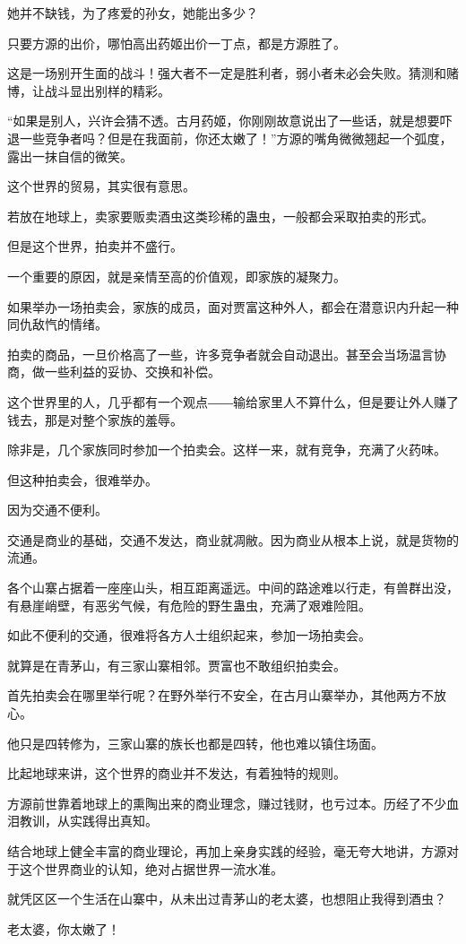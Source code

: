 \begin{this_body}
她并不缺钱，为了疼爱的孙女，她能出多少？

只要方源的出价，哪怕高出药姬出价一丁点，都是方源胜了。

这是一场别开生面的战斗！强大者不一定是胜利者，弱小者未必会失败。猜测和赌博，让战斗显出别样的精彩。

“如果是别人，兴许会猜不透。古月药姬，你刚刚故意说出了一些话，就是想要吓退一些竞争者吗？但是在我面前，你还太嫩了！”方源的嘴角微微翘起一个弧度，露出一抹自信的微笑。

这个世界的贸易，其实很有意思。

若放在地球上，卖家要贩卖酒虫这类珍稀的蛊虫，一般都会采取拍卖的形式。

但是这个世界，拍卖并不盛行。

一个重要的原因，就是亲情至高的价值观，即家族的凝聚力。

如果举办一场拍卖会，家族的成员，面对贾富这种外人，都会在潜意识内升起一种同仇敌忾的情绪。

拍卖的商品，一旦价格高了一些，许多竞争者就会自动退出。甚至会当场温言协商，做一些利益的妥协、交换和补偿。

这个世界里的人，几乎都有一个观点――输给家里人不算什么，但是要让外人赚了钱去，那是对整个家族的羞辱。

除非是，几个家族同时参加一个拍卖会。这样一来，就有竞争，充满了火药味。

但这种拍卖会，很难举办。

因为交通不便利。

交通是商业的基础，交通不发达，商业就凋敝。因为商业从根本上说，就是货物的流通。

各个山寨占据着一座座山头，相互距离遥远。中间的路途难以行走，有兽群出没，有悬崖峭壁，有恶劣气候，有危险的野生蛊虫，充满了艰难险阻。

如此不便利的交通，很难将各方人士组织起来，参加一场拍卖会。

就算是在青茅山，有三家山寨相邻。贾富也不敢组织拍卖会。

首先拍卖会在哪里举行呢？在野外举行不安全，在古月山寨举办，其他两方不放心。

他只是四转修为，三家山寨的族长也都是四转，他也难以镇住场面。

比起地球来讲，这个世界的商业并不发达，有着独特的规则。

方源前世靠着地球上的熏陶出来的商业理念，赚过钱财，也亏过本。历经了不少血泪教训，从实践得出真知。

结合地球上健全丰富的商业理论，再加上亲身实践的经验，毫无夸大地讲，方源对于这个世界商业的认知，绝对占据世界一流水准。

就凭区区一个生活在山寨中，从未出过青茅山的老太婆，也想阻止我得到酒虫？

老太婆，你太嫩了！

\end{this_body}

